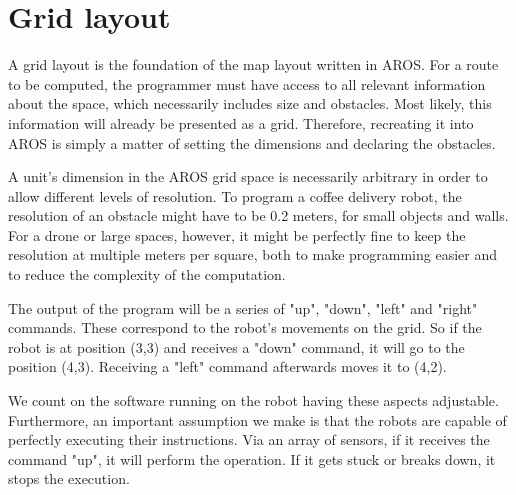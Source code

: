 \section{Grid layout}

A grid layout is the foundation of the map layout written in AROS. For a route to be computed, the programmer must have access to all relevant information about the space, which necessarily includes size and obstacles. Most likely, this information will already be presented as a grid. Therefore, recreating it into AROS is simply a matter of setting the dimensions and declaring the obstacles.
\par
A unit's dimension in the AROS grid space is necessarily arbitrary in order to allow different levels of resolution. To program a coffee delivery robot, the resolution of an obstacle might have to be 0.2 meters, for small objects and walls. For a drone or large spaces, however, it might be perfectly fine to keep the resolution at multiple meters per square, both to make programming easier and to reduce the complexity of the computation.
\par
The output of the program will be a series of "up", "down", "left" and "right" commands. These correspond to the robot's movements on the grid. So if the robot is at position (3,3) and receives a "down" command, it will go to the position (4,3). Receiving a "left" command afterwards moves it to (4,2). 
\par
We count on the software running on the robot having these aspects adjustable. Furthermore, an important assumption we make is that the robots are capable of perfectly executing their instructions. Via an array of sensors, if it receives the command "up", it will perform the operation. If it gets stuck or breaks down, it stops the execution. 
